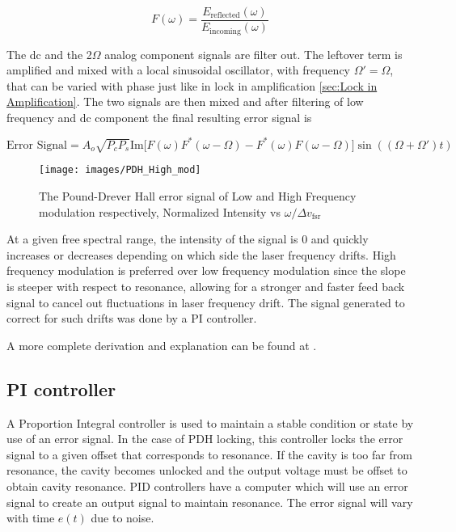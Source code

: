 \documentclass[11pt,a4paper]{book}
\begin{document}
		\begin{equation}
			F(\omega)=\frac{E_\text{reflected}(\omega)}{E_\text{incoming}(\omega)}
		\end{equation}
		
		The dc and the 2$\Omega$ analog component signals are filter out. The leftover term is amplified and mixed with a local sinusoidal oscillator, with frequency $\Omega' = \Omega$, that can be varied with phase just like in lock in amplification \autoref{sec:Lock in Amplification}. The two signals are then mixed and after filtering of low frequency and dc component the final resulting error signal is
		
		\begin{equation}
			\text{Error Signal}= A_o \sqrt{P_c P_s} \text{Im}\big[F(\omega)F^*(\omega - \Omega)-F^*(\omega) F(\omega - \Omega) \big]\sin((\Omega + \Omega')t)
		\end{equation}
		
		\begin{figure}[h]
			\centering
			\texttt{[image: images/PDH\_High\_mod]}
			\caption{ The Pound-Drever Hall error signal of Low and High Frequency modulation respectively, Normalized Intensity vs $\omega /\Delta v_{\text{fsr}}$ \cite{PDH Intro} } 
			\label{HFM PDH}
		\end{figure}
		
		At a given free spectral  range, the intensity of the signal is 0 and quickly increases or decreases depending on which side the laser frequency drifts. 
		High frequency modulation is preferred over low frequency modulation since the slope is steeper with respect to resonance, allowing for a stronger and faster feed back signal to cancel out fluctuations in laser frequency drift. The signal generated to correct for such drifts was done by a PI controller.
		
		A more complete derivation and explanation can be found at \cite{PDH Intro}.
		
		\subsection{PI controller}
			\label{subsec:PI controller}
			A Proportion Integral controller is used to maintain a stable condition or state by use of an error signal. In the case of PDH locking, this controller locks the error signal to a given offset that corresponds to resonance. If the cavity is too far from resonance, the cavity becomes unlocked and the output voltage must be offset to obtain cavity resonance.
			PID controllers have a computer which will use an error signal to create an output signal to maintain resonance. The error signal will vary with time $e(t)$ due to noise.
			
\end{document}
